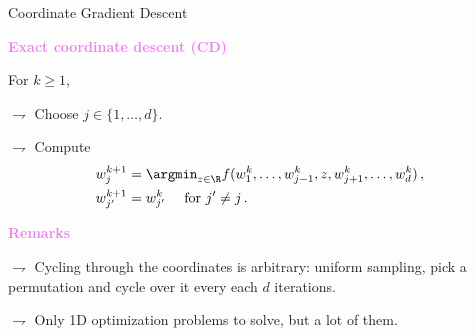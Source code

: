 \documentclass[xcolor={usenames,dvipsnames}]{beamer}
\begin{document}
\begin{frame}{Coordinate Gradient Descent}

\textbf{\textcolor{violet}{Exact coordinate descent (CD)}}

 For $k\geqslant 1$,

$\rightharpoondown$ Choose $j \in \{ 1, \ldots, d \}$.

$\rightharpoondown$ Compute
\begin{align*}
w_{j}^{k+1} &= \argmin_{z \in \R} f(w_1^k, \ldots, w_{j-1}^k, 
z, w_{j+1}^k,
\ldots, w_d^k)\,, \\
w_{j'}^{k+1} &= w_{j'}^{k} \quad \text{ for } j' \neq j\,.
\end{align*}



\medskip 

\textbf{\textcolor{violet}{Remarks}}

$\rightharpoondown$ \alert{Cycling through the coordinates is arbitrary}: uniform sampling, pick a permutation and cycle over it every each $d$ iterations.

$\rightharpoondown$ Only \alert{1D optimization problems to solve}, but a lot of them.

\end{frame}
\end{document}
